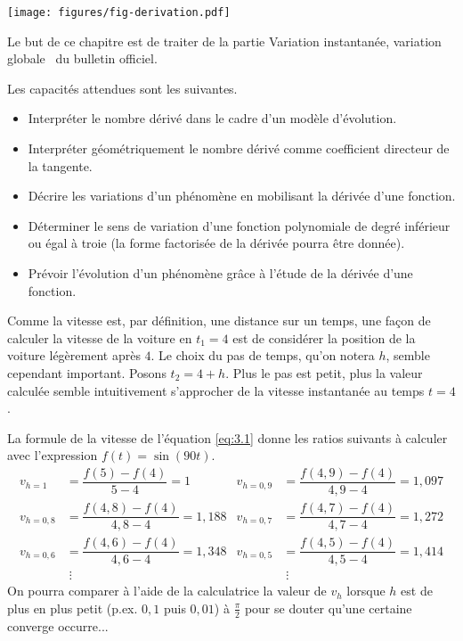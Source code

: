 \texttt{[image: figures/fig-derivation.pdf]}

Le but de ce chapitre est de traiter de la partie \og Variation instantanée, variation globale \fg~du bulletin officiel.

Les capacités attendues sont les suivantes.
\begin{itemize}
	\item Interpréter le nombre dérivé dans le cadre d'un modèle d'évolution.
	\item Interpréter géométriquement le nombre dérivé comme coefficient directeur de la tangente.
	\item Décrire les variations d'un phénomène en mobilisant la dérivée d'une fonction.
	\item Déterminer le sens de variation d'une fonction polynomiale de degré inférieur ou égal à troie (la forme factorisée de la dérivée pourra être donnée).
	\item Prévoir l'évolution d'un phénomène grâce à l'étude de la dérivée d'une fonction.
\end{itemize}

Comme la vitesse est, par définition, une distance sur un temps, une façon de calculer la vitesse de la voiture en $t_1=4$ est de considérer la position de la voiture légèrement après $4$.
Le choix du pas de temps, qu'on notera $h$, semble cependant important. Posons $t_2 = 4+h$.
Plus le pas est petit, plus la valeur calculée semble intuitivement s'approcher de la vitesse instantanée au temps $t=4$.

La formule de la vitesse de l'équation \eqref{eq:3.1} donne les ratios suivants à calculer avec l'expression $f(t) = \sin(90t)$.
\begin{align*}
	v_{h=1} &= \dfrac{f(5) - f(4)}{5-4} = 1 & v_{h=0,9} &=  \dfrac{f(4,9) - f(4)}{4,9-4} = 1,097 \\
	v_{h=0,8} &=  \dfrac{f(4,8) - f(4)}{4,8-4} = 1,188 & v_{h=0,7} &=  \dfrac{f(4,7) - f(4)}{4,7-4} = 1,272 \\
	v_{h=0,6} &=  \dfrac{f(4,6) - f(4)}{4,6-4} = 1,348 & v_{h=0,5} &=  \dfrac{f(4,5) - f(4)}{4,5-4} = 1,414 \\
	&\;\vdots & &\;\vdots
\end{align*}
On pourra comparer à l'aide de la calculatrice la valeur de $v_{h}$ lorsque $h$ est de plus en plus petit (p.ex. $0,1$ puis $0,01$) à $\frac\pi2$ pour se douter qu'une certaine converge occurre...


